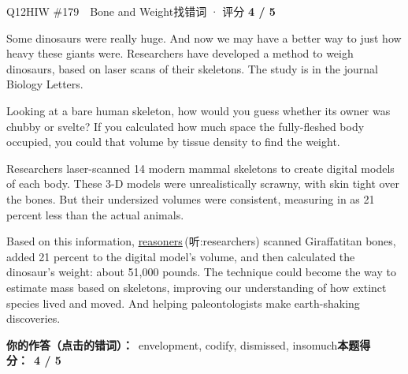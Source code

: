 \begin{qblock}{Q12\quad HIW \#179\ \ Bone and Weight}{找错词 · 评分 \textcolor{cAccent}{\bfseries 4 / 5}}
\begin{promptbox}
Some dinosaurs were really huge. And now we may have a better way to  just how heavy these giants were. Researchers have developed a method to weigh dinosaurs, based on laser scans of their skeletons. The study is in the journal Biology Letters.

Looking at a bare human skeleton, how would you guess whether its owner was chubby or svelte? If you calculated how much space the fully-fleshed body occupied, you could  that volume by tissue density to find the weight.

Researchers laser-scanned 14 modern mammal skeletons to create digital models of each body. These 3-D models were unrealistically scrawny, with skin  tight over the bones. But their undersized volumes were consistent, measuring in as 21 percent less than the actual animals.

Based on this information, {\color{cWrong}\uline{reasoners}}\,{\footnotesize\color{cFix}(听:researchers)} scanned Giraffatitan bones, added 21 percent to the digital model's volume, and then calculated the dinosaur's weight: about 51,000 pounds. The technique could become the  way to estimate mass based on skeletons, improving our understanding of how extinct species lived and moved. And helping paleontologists make earth-shaking discoveries.
\end{promptbox}
\par\smallskip
\textbf{你的作答（点击的错词）：}\ envelopment, codify, dismissed, insomuch\qquad\textbf{本题得分：}\ {\color{cAccent}\bfseries 4 / 5}
\end{qblock}

